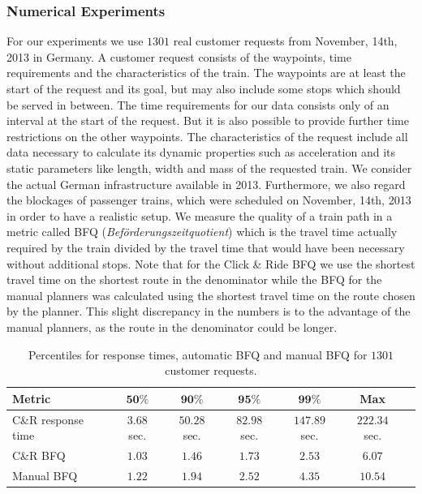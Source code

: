\subsubsection{Numerical Experiments}
For our experiments we use $1301$ real customer requests from November, 14th, 2013 in Germany. A customer request consists of the waypoints, time requirements and the characteristics of the train. The waypoints are at least the start of the request and its goal, but may also include some stops which should be served in between. The time requirements for our data consists only of an interval at the start of the request. But it is also possible to provide further time restrictions on the other waypoints. The characteristics of the request include all data necessary to calculate its dynamic properties such as acceleration and its static parameters like length, width and mass of the requested train. We consider the actual German infrastructure available in 2013. Furthermore, we also regard the blockages of passenger trains, which were scheduled on November, 14th, 2013 in order to have a realistic setup. We measure the quality of a train path in a metric called BFQ (\textit{Beförderungszeitquotient}) which is the travel time actually required by the train divided by the travel time that would have been necessary without additional stops. Note that for the Click \& Ride BFQ we use the shortest travel time on the shortest route in the denominator while the BFQ for the manual planners was calculated using the shortest travel time on the route chosen by the planner. This slight discrepancy in the numbers is to the advantage of the manual planners, as the route in the denominator could be longer.
%
\begin{table}[h]
	\centering
	\caption{Percentiles for response times, automatic BFQ and manual BFQ for $1301$ customer requests.}
	\label{tab:result_CnR}
	\begin{tabular}{lcccccc} \hline
	 	\textbf{Metric}    & $\textbf{50\%}$ & $\textbf{90\%}$ & $\textbf{95\%}$ & $\textbf{99\%}$ & \textbf{Max}  \\ \hline
		C\&R response time & $3.68$ sec.     & $50.28$ sec.    & $82.98$ sec.    & $147.89$ sec.   & $222.34$ sec. \\
		C\&R BFQ           & $1.03$          & $1.46$          & $1.73$          & $2.53$          & $6.07$ \\
		Manual BFQ         & $1.22$          & $1.94$          & $2.52$          & $4.35$          & $10.54$ \\ \hline
	\end{tabular}
\end{table}
\par

